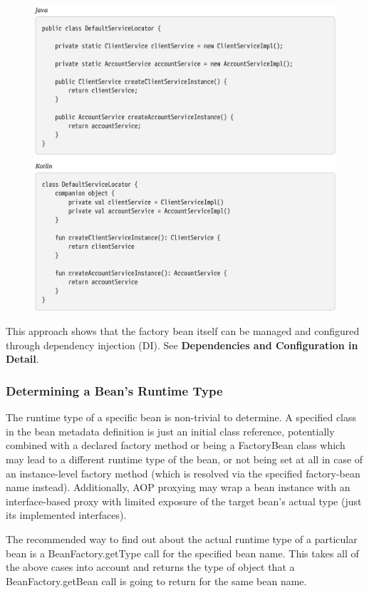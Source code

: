 \begin{figure}[ht]
    \centering
    \includegraphics[width=1\linewidth]{./Figure/IMG_code_20.png}
\end{figure}

This approach shows that the factory bean itself can be managed and configured through
dependency injection (DI). See \textbf{Dependencies and Configuration in Detail}.

\subsubsection{Determining a Bean’s Runtime Type}
The runtime type of a specific bean is non-trivial to determine. A specified class in the bean
metadata definition is just an initial class reference, potentially combined with a declared factory
method or being a FactoryBean class which may lead to a different runtime type of the bean, or not
being set at all in case of an instance-level factory method (which is resolved via the specified
factory-bean name instead). Additionally, AOP proxying may wrap a bean instance with an
interface-based proxy with limited exposure of the target bean’s actual type (just its implemented
interfaces).

The recommended way to find out about the actual runtime type of a particular bean is a
BeanFactory.getType call for the specified bean name. This takes all of the above cases into account
and returns the type of object that a BeanFactory.getBean call is going to return for the same bean
name.

